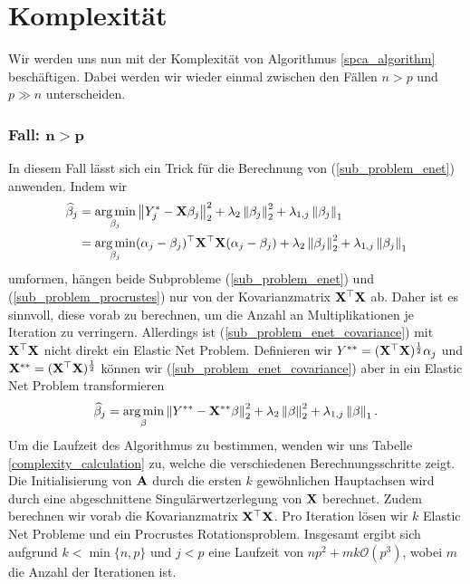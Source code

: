 

\section{Komplexität}
\label{complexity}

Wir werden uns nun mit der Komplexität von Algorithmus \ref{spca_algorithm} beschäftigen. Dabei werden wir wieder einmal zwischen den Fällen $n > p$ und $p \gg n$ unterscheiden.

\subsubsection{Fall: $\mathbf{n > p}$}

In diesem Fall lässt sich ein Trick für die Berechnung von (\ref{sub_problem_enet}) anwenden. Indem wir
\begin{align}
\label{sub_problem_enet_covariance}
\widehat{\beta}_j & = \operatorname*{arg\,min}_{\beta_j} \left\lVert Y_j^* - \mathbf{X} \beta_j \right\rVert_2^2 + \lambda_2 \left\lVert \beta_j \right\rVert_2^2 + \lambda_{1,j}\left\lVert \beta_j \right\rVert_1 \nonumber\\
& = \operatorname*{arg\,min}_{\beta_j} (\alpha_j - \beta_j)^{\top} \mathbf{X}^{\top} \mathbf{X} (\alpha_j - \beta_j) + \lambda_2 \left\lVert \beta_j \right\rVert_2^2 + \lambda_{1,j}\left\lVert \beta_j \right\rVert_1
\end{align}
umformen, hängen beide Subprobleme (\ref{sub_problem_enet}) und (\ref{sub_problem_procrustes}) nur von der Kovarianzmatrix $\mathbf{X}^{\top} \mathbf{X}$ ab. Daher ist es sinnvoll, diese vorab zu berechnen, um die Anzahl an Multiplikationen je Iteration zu verringern. Allerdings ist (\ref{sub_problem_enet_covariance}) mit $\mathbf{X}^{\top} \mathbf{X}$ nicht direkt ein Elastic Net Problem. Definieren wir $Y^{**} = (\mathbf{X}^{\top}\mathbf{X})^{\frac{1}{2}} \alpha_j$ und $\mathbf{X}^{**} = (\mathbf{X}^{\top}\mathbf{X})^{\frac{1}{2}}$ können wir (\ref{sub_problem_enet_covariance}) aber in ein Elastic Net Problem transformieren
$$\widehat{\beta}_j = \operatorname*{arg\,min}_{\beta} \left\lVert Y^{**} - \mathbf{X}^{**} \beta \right\rVert_2^2 + \lambda_2 \left\lVert \beta \right\rVert_2^2 + \lambda_{1,j}\left\lVert \beta \right\rVert_1.$$
Um die Laufzeit des Algorithmus zu bestimmen, wenden wir uns Tabelle \ref{complexity_calculation} zu, welche die verschiedenen Berechnungsschritte zeigt. Die Initialisierung von $\mathbf{A}$ durch die ersten $k$ gewöhnlichen Hauptachsen wird durch eine abgeschnittene Singulärwertzerlegung von $\mathbf{X}$ berechnet. Zudem berechnen wir vorab die Kovarianzmatrix $\mathbf{X}^{\top} \mathbf{X}$. Pro Iteration lösen wir $k$ Elastic Net Probleme und ein Procrustes Rotationsproblem. Insgesamt ergibt sich aufgrund $k < \min \{n,p\}$ und $j < p$ eine Laufzeit von $np^2 + mk\mathcal{O}(p^3)$, wobei $m$ die Anzahl der Iterationen ist.

